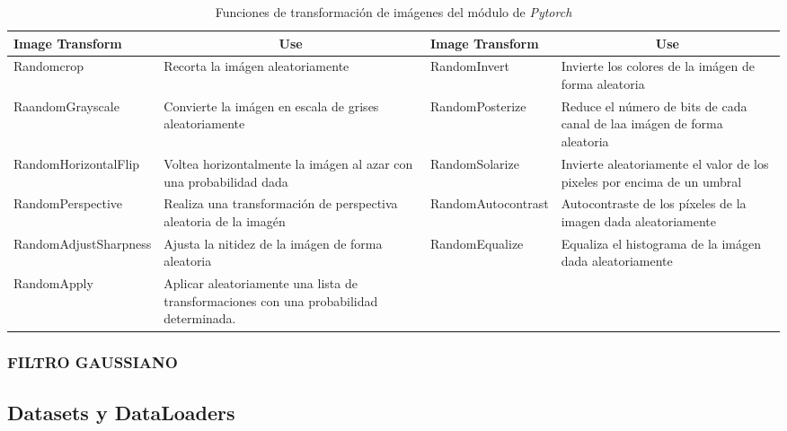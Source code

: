 			\newpage
			
			\begin{table}[ht]
				\centering
				\begin{tabular}{|p{4cm}|p{4cm}|p{4cm}|p{4cm}|}
					\hline
					Image Transform       & \multicolumn{1}{c|}{Use}                                                               & Image Transform       & \multicolumn{1}{c|}{Use}                                                \\ \hline
					Randomcrop            & Recorta la imágen aleatoriamente                                                       & RandomInvert          & Invierte los colores de la imágen de forma aleatoria                    \\ \hline
					RaandomGrayscale      & Convierte la imágen en escala de grises aleatoriamente                                 & RandomPosterize       & Reduce el número de bits de cada canal de laa imágen de forma aleatoria \\ \hline
					RandomHorizontalFlip  & Voltea horizontalmente la imágen al azar con una probabilidad dada                     & RandomSolarize        & Invierte aleatoriamente el valor de los pixeles por encima de un umbral \\ \hline
					RandomPerspective     & Realiza una transformación de perspectiva aleatoria de la imagén                       & RandomAutocontrast    & Autocontraste de los píxeles de la imagen dada aleatoriamente           \\ \hline
					RandomAdjustSharpness & Ajusta la nitidez de la imágen de forma aleatoria                                      & RandomEqualize        & Equaliza el histograma de la imágen dada aleatoriamente                 \\ \hline
					RandomApply           & Aplicar aleatoriamente una lista de transformaciones con una probabilidad determinada. & \multicolumn{1}{l|}{} &                                                                         \\ \hline
				\end{tabular}
				\caption{Funciones de transformación de imágenes del módulo de \textit{Pytorch}}
			\end{table}

			
			\subsubsection{\MakeUppercase{Filtro Gaussiano}}

		\subsection{Datasets y DataLoaders}
